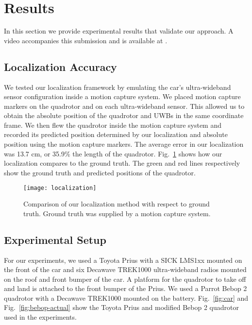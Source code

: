 
\section{Results}

In this section we provide experimental results that validate our approach. A video accompanies this submission and is available at .

\subsection{Localization Accuracy}

We tested our localization framework by emulating the car's ultra-wideband
sensor configuration inside a motion capture system. We placed motion capture
markers on the quadrotor and on each ultra-wideband sensor. This allowed us to
obtain the absolute position of the quadrotor and UWBs in the same coordinate
frame. We then flew the quadrotor inside the motion capture system and recorded
its predicted position determined by our localization and absolute position
using the motion capture markers. The average error in our localization was
13.7 cm, or 35.9\% the length of the quadrotor. Fig.~\ref{fig:localization}
shows how our localization compares to the ground truth. The green and red
lines respectively show the ground truth and predicted positions of the
quadrotor.

\begin{figure}

    \centering

    \texttt{[image: localization]}

    \caption{Comparison of our localization method with respect to
    ground truth. Ground truth was supplied by a motion capture system.}

    \label{fig:localization}

\end{figure}

\subsection{Experimental Setup}

For our experiments, we used a Toyota Prius with a SICK LMS1xx mounted on the
front of the car and six Decawave TREK1000 ultra-wideband radios mounted on the
roof and front bumper of the car. A platform for the quadrotor to take off and
land is attached to the front bumper of the Prius. We used a Parrot Bebop 2
quadrotor with a Decawave TREK1000 mounted on the battery.  Fig.~\ref{fig:car}
and Fig.~\ref{fig:bebop-actual} show the Toyota Prius and modified Bebop 2
quadrotor used in the experiments.

